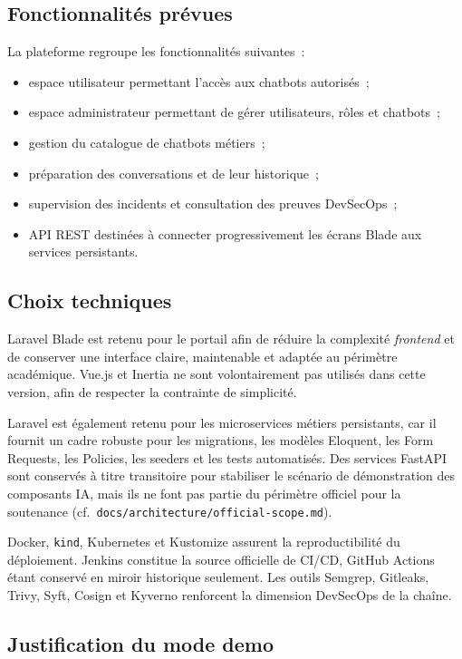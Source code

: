 \subsection{Fonctionnalités prévues}

La plateforme regroupe les fonctionnalités suivantes~:
\begin{itemize}
    \item espace utilisateur permettant l'accès aux chatbots autorisés~;
    \item espace administrateur permettant de gérer utilisateurs, rôles et chatbots~;
    \item gestion du catalogue de chatbots métiers~;
    \item préparation des conversations et de leur historique~;
    \item supervision des incidents et consultation des preuves DevSecOps~;
    \item API REST destinées à connecter progressivement les écrans Blade aux services persistants.
\end{itemize}

\subsection{Choix techniques}

Laravel Blade est retenu pour le portail afin de réduire la complexité \textit{frontend} et de conserver une interface claire, maintenable et adaptée au périmètre académique. Vue.js et Inertia ne sont volontairement pas utilisés dans cette version, afin de respecter la contrainte de simplicité.

Laravel est également retenu pour les microservices métiers persistants, car il fournit un cadre robuste pour les migrations, les modèles Eloquent, les Form Requests, les Policies, les seeders et les tests automatisés. Des services FastAPI sont conservés à titre transitoire pour stabiliser le scénario de démonstration des composants IA, mais ils ne font pas partie du périmètre officiel pour la soutenance (cf.\ \texttt{docs/architecture/official-scope.md}).

Docker, \texttt{kind}, Kubernetes et Kustomize assurent la reproductibilité du déploiement. Jenkins constitue la source officielle de CI/CD, GitHub Actions étant conservé en miroir historique seulement. Les outils Semgrep, Gitleaks, Trivy, Syft, Cosign et Kyverno renforcent la dimension DevSecOps de la chaîne.

\subsection{Justification du mode demo}

